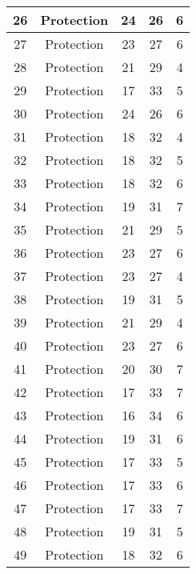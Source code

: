 \documentclass[results.tex]{subfiles}
\begin{document}
\begin{center}
\begin{tabular}{| c || c | c | c | c |}
    \hline
    26 & Protection & 24 & 26 & 6 \\ 
    \hline
    27 & Protection & 23 & 27 & 6 \\ 
    \hline
    28 & Protection & 21 & 29 & 4 \\ 
    \hline
    29 & Protection & 17 & 33 & 5 \\ 
    \hline
    30 & Protection & 24 & 26 & 6 \\ 
    \hline
    31 & Protection & 18 & 32 & 4 \\ 
    \hline
    32 & Protection & 18 & 32 & 5 \\ 
    \hline
    33 & Protection & 18 & 32 & 6 \\ 
    \hline
    34 & Protection & 19 & 31 & 7 \\ 
    \hline
    35 & Protection & 21 & 29 & 5 \\ 
    \hline
    36 & Protection & 23 & 27 & 6 \\ 
    \hline
    37 & Protection & 23 & 27 & 4 \\ 
    \hline
    38 & Protection & 19 & 31 & 5 \\ 
    \hline
    39 & Protection & 21 & 29 & 4 \\ 
    \hline
    40 & Protection & 23 & 27 & 6 \\ 
    \hline
    41 & Protection & 20 & 30 & 7 \\ 
    \hline
    42 & Protection & 17 & 33 & 7 \\ 
    \hline
    43 & Protection & 16 & 34 & 6 \\ 
    \hline
    44 & Protection & 19 & 31 & 6 \\ 
    \hline
    45 & Protection & 17 & 33 & 5 \\ 
    \hline
    46 & Protection & 17 & 33 & 6 \\ 
    \hline
    47 & Protection & 17 & 33 & 7 \\ 
    \hline
    48 & Protection & 19 & 31 & 5 \\ 
    \hline
    49 & Protection & 18 & 32 & 6 \\ 
    \hline   \end{tabular}
\end{center}
\end{document}
